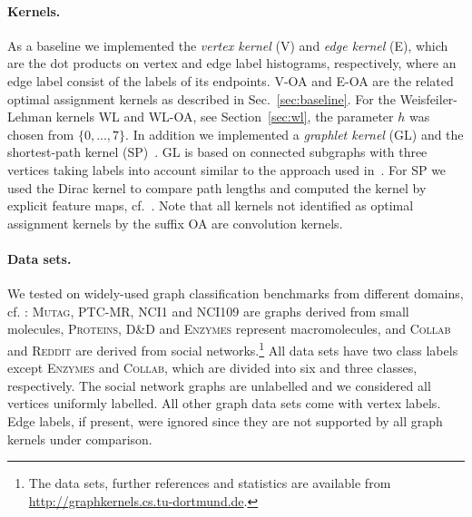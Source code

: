 \documentclass{article}
\begin{document}
\paragraph{Kernels.}
As a baseline we implemented the \emph{vertex kernel} (V) and \emph{edge 
kernel} (E), which are the dot products on vertex and edge label 
histograms, respectively, where an edge label consist of the labels of its
endpoints. V-OA and E-OA are the related optimal assignment kernels as 
described in Sec.~\ref{sec:baseline}. For the Weisfeiler-Lehman kernels WL and 
WL-OA, see Section~\ref{sec:wl}, the parameter $h$ was chosen from $\{0,...,7\}$.
In addition we implemented a \emph{graphlet kernel} (GL) and the shortest-path 
kernel (SP)~\cite{Borgwardt2005}.
GL is based on connected subgraphs with three vertices taking labels into account 
similar to the approach used in~\cite{Shervashidze2011}. For SP we used the Dirac 
kernel to compare path lengths and computed the kernel by explicit feature maps, cf.~\cite{Shervashidze2011}. 
Note that all kernels not identified as optimal assignment kernels by the suffix 
OA are convolution kernels.

\paragraph{Data sets.}
We tested on widely-used graph classification benchmarks from different domains, 
cf. \cite{Borgwardt2005a,Vishwanathan2010,Shervashidze2011,Yanardag2015a}: 
\textsc{Mutag}, \textsc{PTC-MR}, \textsc{NCI1} and \textsc{NCI109} are graphs 
derived from small molecules, \textsc{Proteins}, \textsc{D\&D} and \textsc{Enzymes} 
represent macromolecules, and \textsc{Collab} and \textsc{Reddit} are derived 
from social networks.\footnote{The data sets, further references and statistics 
are available from \url{http://graphkernels.cs.tu-dortmund.de}.}
All data sets have two class labels except \textsc{Enzymes} and \textsc{Collab}, 
which are divided into six and three classes, respectively.
The social network graphs are unlabelled and we considered all vertices uniformly 
labelled. All other graph data sets come with vertex labels.
Edge labels, if present, were ignored since they are not supported by all graph 
kernels under comparison.
\end{document}
